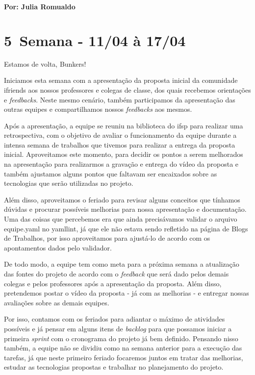 \textbf{Por: Julia Romualdo} 

\section{5\textordfeminine \, Semana - 11/04 à 17/04}
 Estamos de volta, Bunkers!

Iniciamos esta semana com a apresentação da proposta inicial da comunidade \gls{ifriends} aos nossos professores e colegas de classe, dos quais recebemos orientações e \textsl{feedbacks}. Neste mesmo cenário, também participamos da apresentação das outras equipes e compartilhamos nossos \textsl{feedbacks} aos mesmos.

Após a apresentação, a equipe se reuniu na biblioteca do \acs{ifsp} para realizar uma retrospectiva, com o objetivo de avaliar o funcionamento da equipe durante a intensa semana de trabalhos que tivemos para realizar a entrega da proposta inicial. Aproveitamos este momento, para decidir os pontos a serem melhorados na apresentação para realizarmos a gravação e entrega do vídeo da proposta e também ajustamos alguns pontos que faltavam ser encaixados sobre as tecnologias que serão utilizadas no projeto.

Além disso, aproveitamos o feriado para revisar alguns conceitos que tínhamos dúvidas e procurar possíveis melhorias para nossa apresentação e documentação. Uma das coisas que percebemos era que ainda precisávamos validar o arquivo equipe.yaml no yamllint, já que ele não estava sendo refletido na página de Blogs de Trabalhos, por isso aproveitamos para ajustá-lo de acordo com os apontamentos dados pelo validador.

De todo modo, a equipe tem como meta para a próxima semana a atualização das fontes do projeto de acordo com o \textsl{feedback} que será dado pelos demais colegas e pelos professores após a apresentação da proposta. Além disso, pretendemos postar o vídeo da proposta - já com as melhorias - e entregar nossas avaliações sobre as demais equipes.

Por isso, contamos com os feriados para adiantar o máximo de atividades possíveis e já pensar em alguns itens de \textsl{backlog} para que possamos iniciar a primeira \textsl{sprint} com o cronograma do projeto já bem definido. Pensando nisso também, a equipe não se dividiu como na semana anterior para a execução das tarefas, já que neste primeiro feriado focaremos juntos em tratar das melhorias, estudar as tecnologias propostas e trabalhar no planejamento do projeto.

